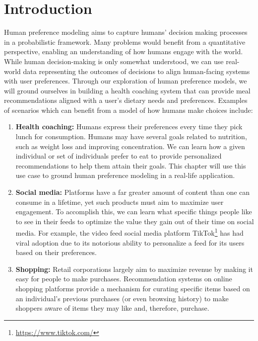 \documentclass[
  letterpaper,
  numbers=noenddot,
  DIV=11]{scrreprt}
\theoremstyle{definition}
\theoremstyle{plain}
\theoremstyle{plain}
\theoremstyle{remark}
\DeclareRobustCommand{\href}[2]{#2\footnote{\url{#1}}}
\begin{document}
\section{Introduction}\label{introduction}

Human preference modeling aims to capture humans' decision making
processes in a probabilistic framework. Many problems would benefit from
a quantitative perspective, enabling an understanding of how humans
engage with the world. While human decision-making is only somewhat
understood, we can use real-world data representing the outcomes of
decisions to align human-facing systems with user preferences. Through
our exploration of human preference models, we will ground ourselves in
building a health coaching system that can provide meal recommendations
aligned with a user's dietary needs and preferences. Examples of
scenarios which can benefit from a model of how humans make choices
include:

\begin{enumerate}
\def\labelenumi{\arabic{enumi}.}
\item
  \textbf{Health coaching:} Humans express their preferences every time
  they pick lunch for consumption. Humans may have several goals related
  to nutrition, such as weight loss and improving concentration. We can
  learn how a given individual or set of individuals prefer to eat to
  provide personalized recommendations to help them attain their goals.
  This chapter will use this use case to ground human preference
  modeling in a real-life application.
\item
  \textbf{Social media:} Platforms have a far greater amount of content
  than one can consume in a lifetime, yet such products must aim to
  maximize user engagement. To accomplish this, we can learn what
  specific things people like to see in their feeds to optimize the
  value they gain out of their time on social media. For example, the
  video feed social media platform
  \href{https://www.tiktok.com/}{TikTok} has had viral adoption due to
  its notorious ability to personalize a feed for its users based on
  their preferences.
\item
  \textbf{Shopping:} Retail corporations largely aim to maximize revenue
  by making it easy for people to make purchases. Recommendation systems
  on online shopping platforms provide a mechanism for curating specific
  items based on an individual's previous purchases (or even browsing
  history) to make shoppers aware of items they may like and, therefore,
  purchase.
\end{enumerate}
\end{document}
